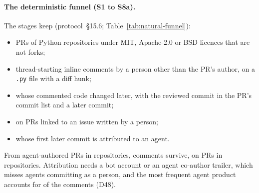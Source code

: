 \paragraph{The deterministic funnel (S1 to S8a).} The stages keep (protocol~\S15.6; Table~\ref{tab:natural-funnel}):
\begin{itemize}
\item PRs of Python repositories under MIT, Apache-2.0 or BSD licences that are not forks;
\item thread-starting inline comments by a person other than the PR's author, on a \texttt{.py} file with a diff hunk;
\item whose commented code changed later, with the reviewed commit in the PR's commit list and a later commit;
\item on PRs linked to an issue written by a person;
\item whose first later commit is attributed to an agent.
\end{itemize}
From  agent-authored PRs in  repositories,  comments
survive, on  PRs in  repositories. Attribution needs a bot account or an agent
co-author trailer, which misses agents committing as a person, and the most frequent agent product accounts for
 of the  comments (D48).

